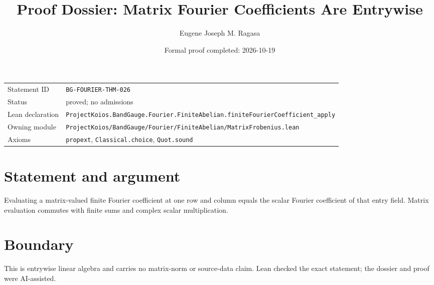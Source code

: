 \documentclass[11pt]{article}
\title{Proof Dossier: Matrix Fourier Coefficients Are Entrywise}
\author{Eugene Joseph M. Ragasa}
\date{Formal proof completed: 2026-10-19}
\begin{document}
\maketitle
\noindent\begin{tabularx}{\textwidth}{@{}lX@{}}\toprule
Statement ID & \texttt{BG-FOURIER-THM-026} \\
Status & proved; no admissions \\
Lean declaration & \texttt{ProjectKoios.BandGauge.Fourier.FiniteAbelian.}\newline\texttt{finiteFourierCoefficient\_apply} \\
Owning module & \texttt{ProjectKoios/BandGauge/Fourier/FiniteAbelian/MatrixFrobenius.lean} \\
Axioms & \texttt{propext}, \texttt{Classical.choice}, \texttt{Quot.sound} \\
\bottomrule\end{tabularx}
\section{Statement and argument}
Evaluating a matrix-valued finite Fourier coefficient at one row and column equals the scalar Fourier coefficient of that entry field. Matrix evaluation commutes with finite sums and complex scalar multiplication.
\section{Boundary}
This is entrywise linear algebra and carries no matrix-norm or source-data claim. Lean checked the exact statement; the dossier and proof were AI-assisted.
\end{document}
